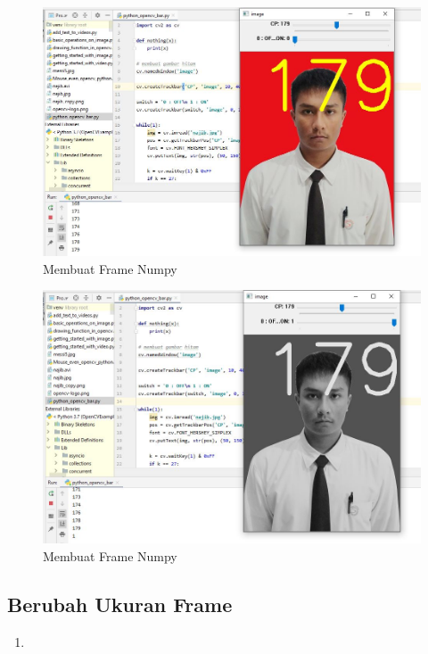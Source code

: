\begin{figure}[ht]
\centering
\includegraphics[scale=0.5]{figures/2,33,1.jpg}
\caption{Membuat Frame Numpy}
\label{contoh}
\end{figure}

\begin{figure}[ht]
\centering
\includegraphics[scale=0.5]{figures/2,33,2.jpg}
\caption{Membuat Frame Numpy}
\label{contoh}
\end{figure}



\newpage
\subsection{Berubah Ukuran Frame}

\begin{enumerate}
	\item
\end{enumerate}

